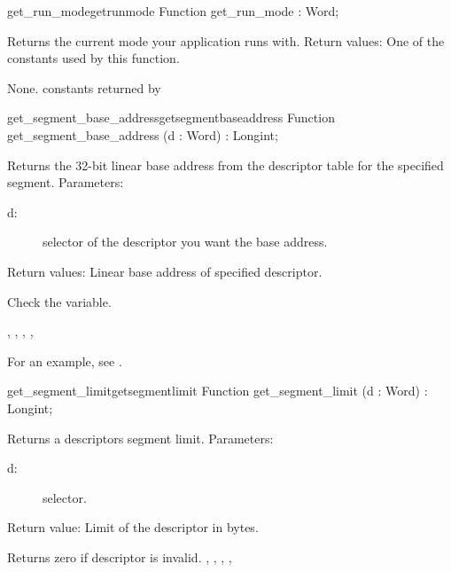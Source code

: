 \begin{functionl}{get\_run\_mode}{getrunmode}
\Declaration
Function get\_run\_mode  : Word;

\Description
Returns the current mode your application runs with.
Return values: One of the constants used by this function.

\Errors
None. 
\SeeAlso
 constants returned by   
\end{functionl}
\latex{}
\html{}
\begin{functionl}{get\_segment\_base\_address}{getsegmentbaseaddress}
\Declaration
Function get\_segment\_base\_address  
(d : Word) : Longint;

\Description
 Returns the 32-bit linear base address from the descriptor table for the
specified segment.
Parameters: 
\begin{description}
\item[d:\ ] selector of the descriptor you want the base address.
\end{description}
Return values: Linear base address of specified descriptor.

\Errors
 Check the  variable.
\SeeAlso

,
, 
,
,

\end{functionl}
For an example, see 
.
\begin{functionl}{get\_segment\_limit}{getsegmentlimit}
\Declaration
Function get\_segment\_limit (d : Word) : Longint;

\Description
Returns a descriptors segment limit.
Parameters:
\begin{description}
\item [d:\ ] selector.
\end{description}
Return value: Limit of the descriptor in bytes.

\Errors
 Returns zero if descriptor is invalid. 
\SeeAlso
{},
, 
,
, 

\end{functionl}
